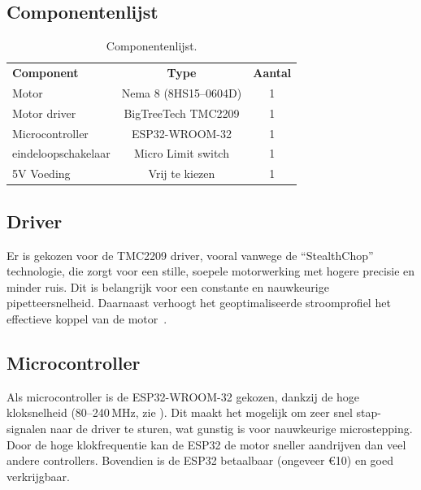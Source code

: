 \subsection{Componentenlijst}
\begin{table}[H]
    \begin{tabular}{l|c|c}
        \textbf{Component} & \textbf{Type} & \textbf{Aantal} \\
        Motor & Nema 8 (8HS15--0604D)& 1 \\
        Motor driver & BigTreeTech TMC2209 & 1 \\
        Microcontroller & ESP32-WROOM-32 & 1 \\
        eindeloopschakelaar & Micro Limit switch & 1 \\
        5V Voeding & Vrij te kiezen\footnotemark & 1 \\
        \hline
    \end{tabular}
    \caption{Componentenlijst.}\label{tab:componentenlijst}
\end{table}
\subsection{Driver}
Er is gekozen voor de TMC2209 driver, vooral vanwege de ``StealthChop'' technologie, die zorgt voor een stille, soepele motorwerking met hogere precisie en minder ruis. Dit is belangrijk voor een constante en nauwkeurige pipetteersnelheid. Daarnaast verhoogt het geoptimaliseerde stroomprofiel het effectieve koppel van de motor\ \cite{RN45}.

\subsection{Microcontroller}
Als microcontroller is de ESP32-WROOM-32 gekozen, dankzij de hoge kloksnelheid (80–240\,MHz, zie \cite{RN47}). Dit maakt het mogelijk om zeer snel stap-signalen naar de driver te sturen, wat gunstig is voor nauwkeurige microstepping. Door de hoge klokfrequentie kan de ESP32 de motor sneller aandrijven dan veel andere controllers. Bovendien is de ESP32 betaalbaar (ongeveer €10) en goed verkrijgbaar.
